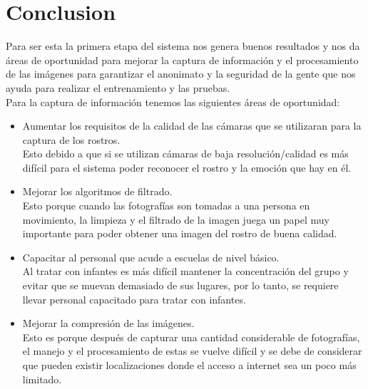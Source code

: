 
\section{Conclusion}

Para ser esta la primera etapa del sistema nos genera buenos resultados y nos
da áreas de oportunidad para mejorar la captura de información y el
procesamiento de las imágenes para garantizar el anonimato y la seguridad de la
gente que nos ayuda para realizar el entrenamiento y las pruebas. \\Para la
captura de información tenemos las siguientes áreas de oportunidad:
\begin{itemize}
    \item Aumentar los requisitos de la calidad de las cámaras que se utilizaran para la
          captura de los rostros. \\Esto debido a que si se utilizan cámaras de baja
          resolución/calidad es más difícil para el sistema poder reconocer el rostro y
          la emoción que hay en él.
    \item Mejorar los algoritmos de filtrado. \\Esto porque cuando las fotografías son
          tomadas a una persona en movimiento, la limpieza y el filtrado de la imagen
          juega un papel muy importante para poder obtener una imagen del rostro de buena
          calidad.
    \item Capacitar al personal que acude a escuelas de nivel básico. \\Al tratar con
          infantes es más difícil mantener la concentración del grupo y evitar que se
          muevan demasiado de sus lugares, por lo tanto, se requiere llevar personal
          capacitado para tratar con infantes.
    \item Mejorar la compresión de las imágenes. \\Esto es porque después de capturar una
          cantidad considerable de fotografías, el manejo y el procesamiento de estas se
          vuelve difícil y se debe de considerar que pueden existir localizaciones donde
          el acceso a internet sea un poco más limitado.
\end{itemize}